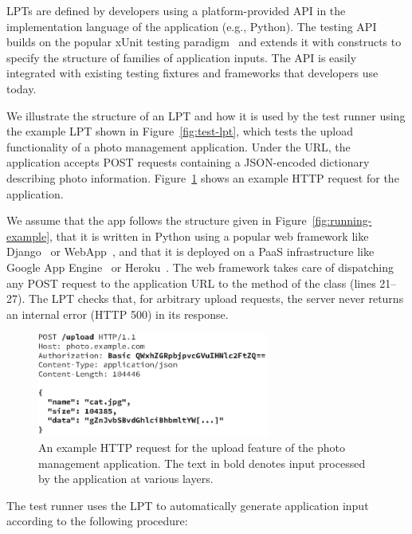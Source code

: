  LPTs are defined by developers using a platform-provided API in the implementation language of the application (e.g., Python).  The testing API builds on the popular xUnit testing paradigm~\cite{xunit} and extends it with constructs to specify the structure of families of application inputs.  The API is easily integrated with existing testing fixtures and frameworks that developers use today.

We illustrate the structure of an LPT and how it is used by the test runner using the example LPT  shown in Figure~\ref{fig:test-lpt}, which tests the upload functionality of a photo management application.  Under the  URL, the application accepts POST requests containing a JSON-encoded dictionary describing photo information.  Figure~\ref{fig:http-packet} shows an example HTTP request for the application.

We assume that the app follows the structure given in Figure~\ref{fig:running-example}, that it is written in Python using a popular web framework like Django~\cite{py-django} or WebApp~\cite{webapp2}, and that it is deployed on a PaaS infrastructure like Google App Engine~\cite{google-gae} or Heroku~\cite{heroku}.  The web framework takes care of dispatching any POST request to the  application URL to the  method of the  class (lines 21--27).
%
The  LPT checks that, for arbitrary upload requests, the server never returns an internal error (HTTP 500) in its response.

\begin{figure}
  \centering
  \includegraphics[width=3in]{figures/paas/http-packet}
  \caption{An example HTTP request for the upload feature of the photo
    management application.  The text in bold denotes input processed
    by the application at various layers.}
  \label{fig:http-packet}
\end{figure}

The test runner uses the LPT to automatically generate application
input according to the following procedure:


